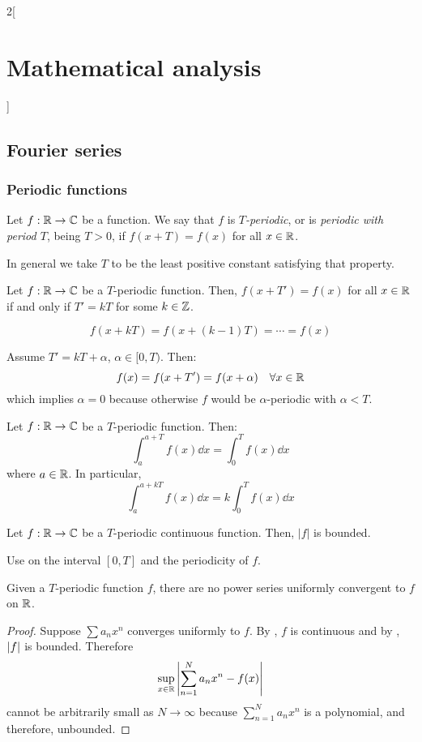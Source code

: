 \documentclass[../../../main_math.tex]{subfiles}
\begin{document}
\begin{multicols}{2}[\section{Mathematical analysis}]
  \subsection{Fourier series}\label{MA:fouriersection}
  \subsubsection{Periodic functions}
  \begin{definition}
    Let $f:\mathbb{R} \rightarrow\mathbb{C} $ be a function. We say that $f$ is \emph{$T$-periodic}, or is \emph{periodic with period $T$}, being $T>0$, if $f(x+T)=f(x)$ for all $x\in\mathbb{R} $.
  \end{definition}
  \begin{remark}
    In general we take $T$ to be the least positive constant satisfying that property.
  \end{remark}
  \begin{lemma}
    Let $f:\mathbb{R} \rightarrow\mathbb{C} $ be a $T$-periodic function. Then, $f(x+T')=f(x)$ for all $x\in\mathbb{R} $ if and only if $T'=kT$ for some $k\in\mathbb{Z} $.
  \end{lemma}
  \begin{sproof}
    \begin{itemizeiff}
      $$f(x+kT)=f(x+(k-1)T)=\cdots=f(x)$$
      \item Assume $T'=kT+\alpha$, $\alpha\in[0,T)$. Then:
      $$f(x)=f(x+T')=f(x+\alpha)\quad\forall x\in\mathbb{R}$$
      which implies $\alpha=0$ because otherwise $f$ would be $\alpha$-periodic with $\alpha<T$.
    \end{itemizeiff}
  \end{sproof}
  \begin{proposition}\label{MA:invarianceperiodicint}
    Let $f:\mathbb{R} \rightarrow\mathbb{C} $ be a $T$-periodic function. Then: $$\int_a^{a+T}f(x)\dd{x}=\int_0^Tf(x)\dd{x}$$ where $a\in\mathbb{R} $. In particular, $$\int_a^{a+kT}f(x)\dd{x}=k\int_0^Tf(x)\dd{x}$$
  \end{proposition}
  \begin{lemma}\label{MA:periodicbounded}
    Let $f:\mathbb{R} \rightarrow\mathbb{C} $ be a $T$-periodic continuous function. Then, $|f|$ is bounded.
  \end{lemma}
  \begin{sproof}
    Use  on the interval $[0,T]$ and the periodicity of $f$.
  \end{sproof}
  \begin{proposition}
    Given a $T$-periodic function $f$, there are no power series uniformly convergent to $f$ on $\mathbb{R}$.
  \end{proposition}
  \begin{proof}
    Suppose $\sum a_nx^n$ converges uniformly to $f$. By , $f$ is continuous and by , $\abs{f}$ is bounded. Therefore $$\sup_{x\in\mathbb{R}}\left|\sum_{n=1}^{N}a_nx^n-f(x)\right|$$
    cannot be arbitrarily small as $N\to\infty$ because $\sum_{n=1}^{N}a_nx^n$ is a polynomial, and therefore, unbounded.
  \end{proof}

\end{multicols}
\end{document}
